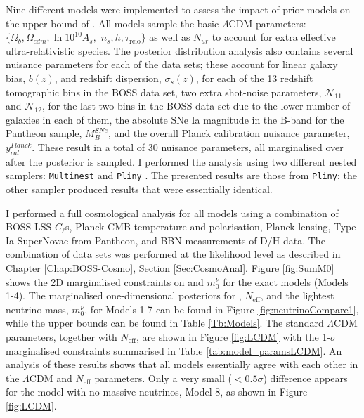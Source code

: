  Nine different models were implemented to assess the impact of prior models on the upper bound of \NM{}. All models sample the basic $\Lambda$CDM parameters: $\{\Omega_b, \Omega_{cdm}, \ln 10^{10}A_s,$ $ n_s, h, \tau_{\text{reio}}\}$ as well as $N_{ur}$ to account for extra effective ultra-relativistic species. The posterior distribution analysis also contains several nuisance parameters for each of the data sets; these account for linear galaxy bias, $b(z)$, and redshift dispersion, $\sigma_s(z)$, for each of the 13 redshift tomographic bins in the BOSS data set, two extra shot-noise parameters, $\mathcal{N}_{11}$ and  $\mathcal{N}_{12}$, for the last two bins in the BOSS data set due to the lower number of galaxies in each of them, the absolute SNe Ia magnitude in the B-band for the Pantheon sample, $M_B^{SNe}$, and the overall Planck calibration nuisance parameter, $y_{cal}^{Planck}$. These result in a total of 30 nuisance parameters, all marginalised over after the posterior is sampled. I performed the analysis using two different nested samplers: \texttt{Multinest} \citep{2009Multinest} and \texttt{Pliny} \citep{PlinyRichardThesis}. The presented results are those from \texttt{Pliny}; the other sampler produced results that were essentially identical. %
 
 
\qquad I performed a full cosmological analysis for all models using a combination of BOSS LSS $C_{\ell}$s, Planck CMB temperature and polarisation, Planck lensing, Type Ia SuperNovae from Pantheon, and BBN measurements of D/H data. The combination of data sets was performed at the likelihood level as described in Chapter \ref{Chap:BOSS-Cosmo}, Section \ref{Sec:CosmoAnal}. Figure \ref{fig:SumM0} shows the 2D marginalised constraints on \NM{} and $m_0^{\nu}$ for the exact models (Models 1-4). The marginalised one-dimensional posteriors for \NM{}, $N_{\text{eff}}$, and the lightest neutrino mass, $m_{0}^{\nu}$, for Models 1-7 can be found in Figure \ref{fig:neutrinoCompare1}, while the upper bounds can be found in Table \ref{Tb:Models}. The standard $\Lambda$CDM parameters, together with $N_{\text{eff}}$, are shown in Figure \ref{fig:LCDM} with the 1-$\sigma$ marginalised constraints summarised in Table \ref{tab:model_paramsLCDM}. An analysis of these results shows that all models essentially agree with each other in the $\Lambda$CDM and $N_{\text{eff}}$ parameters. Only a very small ($< 0.5 \sigma$) difference appears for the model with no massive neutrinos, Model 8, as shown in Figure \ref{fig:LCDM}.

